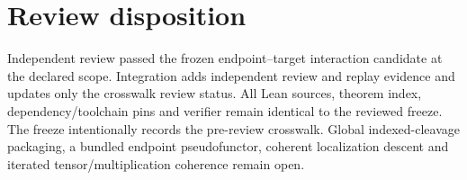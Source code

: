 \documentclass{article}
\begin{document}
\section*{Review disposition}
Independent review passed the frozen endpoint--target interaction candidate at the declared scope. Integration adds independent review and replay evidence and updates only the crosswalk review status. All Lean sources, theorem index, dependency/toolchain pins and verifier remain identical to the reviewed freeze. The freeze intentionally records the pre-review crosswalk. Global indexed-cleavage packaging, a bundled endpoint pseudofunctor, coherent localization descent and iterated tensor/multiplication coherence remain open.
\end{document}
